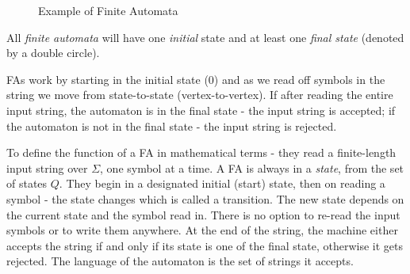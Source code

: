 \begin{figure}[H]
    \centering
    \caption{Example of Finite Automata}
    \label{fig:eg-fa}
\end{figure}

All \textit{finite automata} will have one \textit{initial} state and at least one \textit{final state} (denoted by a double circle). 

FAs work by starting in the initial state (0) and as we read off symbols in the string we move from state-to-state (vertex-to-vertex). If after reading the entire input string, the automaton is in the final state - the input string is accepted; if the automaton is not in the final state - the input string is rejected.

To define the function of a FA in mathematical terms - they read a finite-length input string over $\Sigma$, one symbol at a time. A FA is always in a \textit{state}, from the set of states $Q$. They begin in a designated initial (start) state, then on reading a symbol - the state changes which is called a transition. The new state depends on the current state and the symbol read in. There is no option to re-read the input symbols or to write them anywhere. At the end of the string, the machine either accepts the string if and only if its state is one of the final state, otherwise it gets rejected. The language of the automaton is the set of strings it accepts.

